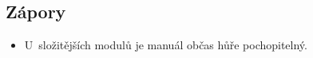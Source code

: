 \subsection*{Zápory}

\begin{itemize}
    \item U~složitějších modulů je manuál občas hůře pochopitelný.
\end{itemize}
